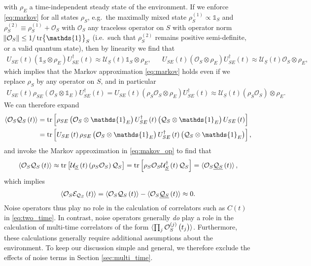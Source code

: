 \documentclass[aps,pra,twocolumn,longbibliography]{revtex4-2}
\newcommand{\p}[1]{\left( #1 \right)} %
\renewcommand{\sp}[1]{\left[ #1 \right]} %
\newcommand{\bk}{\braket} %
\newcommand{\ul}{\underline} %
\newcommand{\E}{\mathcal{E}}
\renewcommand{\O}{\mathcal{O}}
\newcommand{\Q}{\mathcal{Q}}
\newcommand{\U}{\mathcal{U}}
\newcommand{\1}{\mathds{1}}
\begin{document}
with $\rho_E$ a time-independent steady state of the environment.  If
we enforce \eqref{eq:markov} for all states $\rho_S$, e.g.~the
maximally mixed state $\rho_S^{(1)}\propto\1_S$ and
$\rho_S^{(2)}\equiv\rho_S^{(1)}+\O_S$ with $\O_S$ any traceless
operator on $S$ with operator norm $\norm{\O_S}\le1/\tr\1_S$
(i.e.~such that $\rho_S^{(2)}$ remains positive semi-definite, or a
valid quantum state), then by linearity we find that
\begin{align}
  U_{SE}\p{t} \p{\1_S\otimes\rho_E} U_{SE}^\dag\p{t}
  \approx \U_{\ul S}\p{t} \1_S\otimes\rho_E,
  &&
  U_{SE}\p{t} \p{\O_S\otimes\rho_E} U_{SE}^\dag\p{t}
  \approx \U_{\ul S}\p{t} \O_S\otimes\rho_E,
\end{align}
which implies that the Markov approximation \eqref{eq:markov} holds
even if we replace $\rho_S$ by any operator on $S$, and in particular
\begin{align}
  U_{SE}\p{t} \rho_{SE} \p{\O_S\otimes\1_E} U_{SE}^\dag\p{t}
  = U_{SE}\p{t} \p{\rho_S\O_S\otimes\rho_E} U_{SE}^\dag\p{t}
  \approx \U_{\ul S}\p{t}\p{\rho_S\O_S}\otimes\rho_E.
  \label{eq:makov_op}
\end{align}
We can therefore expand
\begin{align}
  \bk{\O_S\Q_S\p{t}}
  &= \tr\sp{\rho_{SE} \p{\O_S\otimes\1_E}
    U_{SE}^\dag\p{t} \p{\Q_S\otimes\1_E} U_{SE}\p{t}} \\
  &= \tr\sp{U_{SE}\p{t} \rho_{SE} \p{\O_S\otimes\1_E}
    U_{SE}^\dag\p{t} \p{\Q_S\otimes\1_E}},
\end{align}
and invoke the Markov approximation in \eqref{eq:makov_op} to find
that
\begin{align}
  \bk{\O_S\Q_S\p{t}}
  \approx \tr\sp{\U_{\ul S}\p{t}\p{\rho_S\O_S} \Q_S}
  = \tr\sp{\rho_S \O_S \U_{\ul S}^\dag\p{t} \Q_S}
  = \bk{\O_S\ul{\Q_S}\p{t}},
\end{align}
which implies
\begin{align}
  \bk{\O_S\E_{\Q_S}\p{t}}
  = \bk{\O_S\Q_S\p{t}} - \bk{\O_S\ul{\Q_S}\p{t}}
  \approx 0.
\end{align}
Noise operators thus play no role in the calculation of correlators
such as $C\p{t}$ in \eqref{eq:two_time}.  In contrast, noise operators
generally {\it do} play a role in the calculation of multi-time
correlators of the form
$\bk{\prod_j\O_S^{(j)}\p{t_j}}$\cite{blocher2019quantum}.
Furthermore, these calculations generally require additional
assumptions about the environment.  To keep our discussion simple and
general, we therefore exclude the effects of noise terms in Section
\ref{sec:multi_time}.
\end{document}
